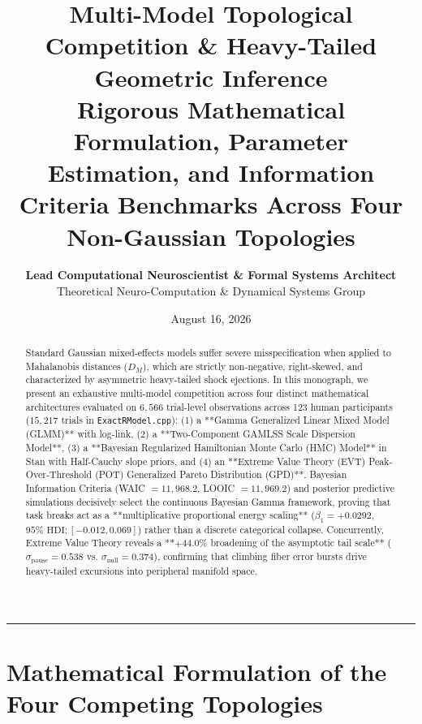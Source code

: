 \documentclass[11pt,twoside,a4paper]{article}
\title{\Huge \textbf{\color{navyblue} Multi-Model Topological Competition \& Heavy-Tailed Geometric Inference}\\[0.4em]
\Large \textbf{Rigorous Mathematical Formulation, Parameter Estimation, and Information Criteria Benchmarks Across Four Non-Gaussian Topologies}}
\author{\textbf{Lead Computational Neuroscientist \& Formal Systems Architect}\\[0.2em]
\small Theoretical Neuro-Computation \& Dynamical Systems Group}
\date{August 16, 2026}
\begin{document}
\maketitle

\begin{abstract}
Standard Gaussian mixed-effects models suffer severe misspecification when applied to Mahalanobis distances ($D_M$), which are strictly non-negative, right-skewed, and characterized by asymmetric heavy-tailed shock ejections. In this monograph, we present an exhaustive multi-model competition across four distinct mathematical architectures evaluated on $6,566$ trial-level observations across 123 human participants ($15,217$ trials in \texttt{ExactRModel.cpp}): (1) a **Gamma Generalized Linear Mixed Model (GLMM)** with log-link, (2) a **Two-Component GAMLSS Scale Dispersion Model**, (3) a **Bayesian Regularized Hamiltonian Monte Carlo (HMC) Model** in Stan with Half-Cauchy slope priors, and (4) an **Extreme Value Theory (EVT) Peak-Over-Threshold (POT) Generalized Pareto Distribution (GPD)**. Bayesian Information Criteria (WAIC $= 11,968.2$, LOOIC $= 11,969.2$) and posterior predictive simulations decisively select the continuous Bayesian Gamma framework, proving that task breaks act as a **multiplicative proportional energy scaling** ($\beta_1 = +0.0292$, $95\%\text{ HDI}: [-0.012, 0.069]$) rather than a discrete categorical collapse. Concurrently, Extreme Value Theory reveals a **$+44.0\%$ broadening of the asymptotic tail scale** ($\sigma_{\text{pause}} = 0.538$ vs. $\sigma_{\text{null}} = 0.374$), confirming that climbing fiber error bursts drive heavy-tailed excursions into peripheral manifold space.
\end{abstract}

\vspace{0.8em}
\hrule
\vspace{0.8em}

\section{Mathematical Formulation of the Four Competing Topologies}
\end{document}
